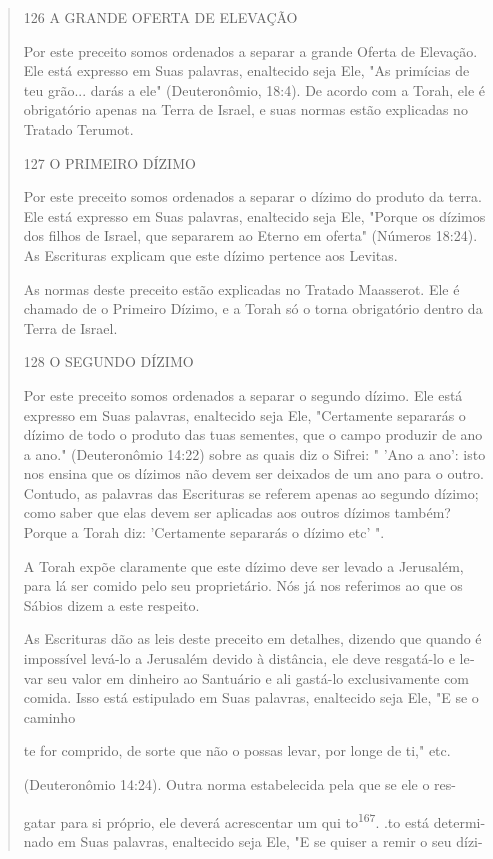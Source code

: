 \begin{quote}
126 A GRANDE OFERTA DE ELEVAÇÃO

Por este preceito somos ordenados a separar a grande Oferta de
Ele­vação. Ele está expresso em Suas palavras, enaltecido seja Ele, "As
primícias de teu grão... darás a ele" (Deuteronômio, 18:4). De acordo
com a Torah, ele é obrigatório apenas na Terra de Israel, e suas normas
estão explicadas no Tra­tado Terumot.

127 O PRIMEIRO DÍZIMO

Por este preceito somos ordenados a separar o dízimo do produto da
terra. Ele está expresso em Suas palavras, enaltecido seja Ele, "Porque
os dízimos dos filhos de Israel, que separarem ao Eterno em oferta"
(Números 18:24). As Escrituras explicam que este dízimo pertence aos
Levitas.

As normas deste preceito estão explicadas no Tratado Maasserot. Ele é
chamado de o Primeiro Dízimo, e a Torah só o torna obrigatório dentro da
Terra de Israel.

128 O SEGUNDO DÍZIMO

Por este preceito somos ordenados a separar o segundo dízimo. Ele está
expresso em Suas palavras, enaltecido seja Ele, "Certamente separarás o
dízimo de todo o produto das tuas sementes, que o campo produzir de ano
a ano." (Deuteronômio 14:22) sobre as quais diz o Sifrei: " 'Ano a ano':
isto nos ensina que os dízimos não devem ser deixados de um ano para o
outro. Contudo, as palavras das Escrituras se referem apenas ao segundo
dízimo; co­mo saber que elas devem ser aplicadas aos outros dízimos
também? Porque a Torah diz: 'Certamente separarás o dízimo etc' ".

A Torah expõe claramente que este dízimo deve ser levado a Jerusa­lém,
para lá ser comido pelo seu proprietário. Nós já nos referimos ao que os
Sábios dizem a este respeito.

As Escrituras dão as leis deste preceito em detalhes, dizendo que
quan­do é impossível levá-lo a Jerusalém devido à distância, ele deve
resgatá-lo e le­var seu valor em dinheiro ao Santuário e ali gastá-lo
exclusivamente com comi­da. Isso está estipulado em Suas palavras,
enaltecido seja Ele, "E se o caminho

te for comprido, de sorte que não o possas levar, por longe de ti," etc.

(Deuteronômio 14:24). Outra norma estabelecida pela que se ele o res-

gatar para si próprio, ele deverá acrescentar um qui
to\textsuperscript{167}. .to está determi-\\
nado em Suas palavras, enaltecido seja Ele, "E se quiser a remir o seu
dízi-
\end{quote}

